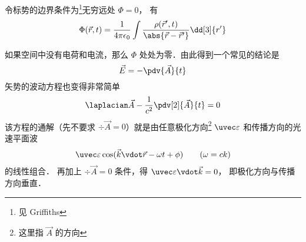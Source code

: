 令标势的边界条件为\footnote{见 Griffiths}无穷远处 $\Phi = 0$， 有
\begin{equation}
\Phi(\vec r, t) = \frac{1}{4\pi\epsilon_0} \int \frac{\rho(\vec r', t)}{\abs{\vec r - \vec r'}} \dd[3]{r'}
\end{equation}

如果空间中没有电荷和电流，那么 $\Phi$ 处处为零．由此得到一个常见的结论是
\begin{equation}
\vec E = - \pdv{\vec A}{t}
\end{equation}
矢势的波动方程也变得非常简单
\begin{equation}
\laplacian \vec A - \frac{1}{c^2} \pdv[2]{\vec A}{t} = 0
\end{equation}
该方程的通解（先不要求 $\div \vec A = 0$）就是由任意极化方向\footnote{这里指 $\vec A$ 的方向} $\uvec \varepsilon$ 和传播方向的光速平面波
\begin{equation}
\uvec \varepsilon \cos(\vec k \vdot \vec r - \omega t + \phi) \qquad (\omega = ck)
\end{equation}
的线性组合． 再加上 $\div \vec A = 0$ 条件，得 $\uvec \varepsilon \vdot \vec k = 0$， 即极化方向与传播方向垂直．
